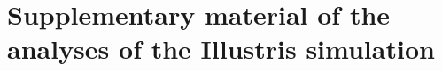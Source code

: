 
\doublespacing
\chapter{Supplementary material of the analyses of the Illustris simulation}{}{}
\label{appendix2}
